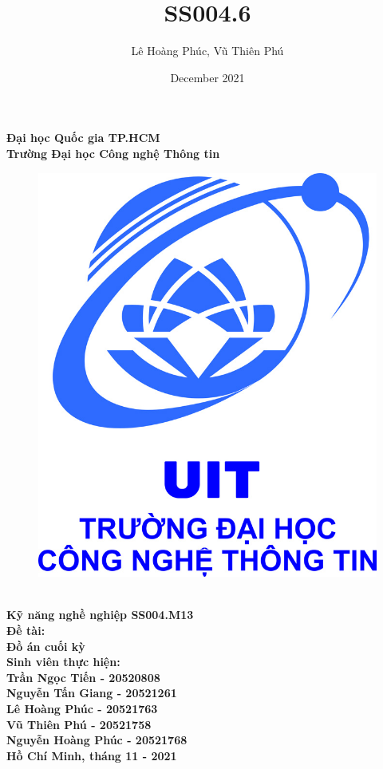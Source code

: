 \documentclass[13pt,a4paper]{article}
\title{SS004.6}
\author{Lê Hoàng Phúc, Vũ Thiên Phú}
\date{December 2021}
\begin{document}
\begin{titlepage}
\begin{center}
    \centering
    \LARGE
    \textbf {Đại học Quốc gia TP.HCM\\}
    \textbf {Trường Đại học Công nghệ Thông tin\\[1.5cm]}
\end{center}



\begin{figure} [!htp]
  \centering
  \includegraphics {Logo}
\end{figure}

\begin{center}
    \Large
    \textbf{\huge\\[0.01cm] Kỹ năng nghề nghiệp SS004.M13\\[0.5cm]}
    \textbf{Đề tài:\\}
    \textbf{\huge Đồ án cuối kỳ \\[0.5cm]}
    \textbf{Sinh viên thực hiện:\\[0.5cm]}
    \textbf{Trần Ngọc Tiến - 20520808\\}
    \textbf{Nguyễn Tấn Giang - 20521261\\}
    \textbf{Lê Hoàng Phúc - 20521763\\}
    \textbf{Vũ Thiên Phú - 20521758\\}
    \textbf{Nguyễn Hoàng Phúc - 20521768\\[1.5cm]}
    \textbf{Hồ Chí Minh, tháng 11 - 2021}
\end{center}
\end{titlepage}
\thispagestyle{empty}
\setcounter{page}{0}
\end{document}
